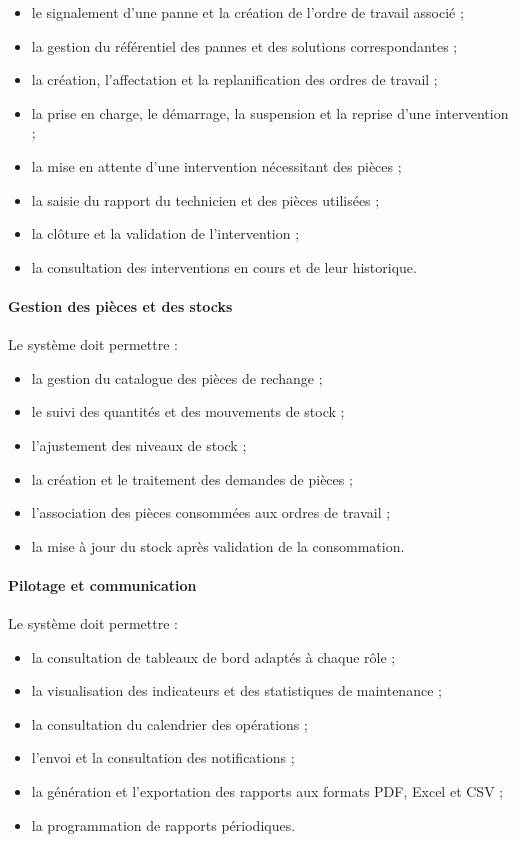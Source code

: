 \begin{itemize}
    \item le signalement d’une panne et la création de l’ordre de travail associé ;
    \item la gestion du référentiel des pannes et des solutions correspondantes ;
    \item la création, l’affectation et la replanification des ordres de travail ;
    \item la prise en charge, le démarrage, la suspension et la reprise d’une intervention ;
    \item la mise en attente d’une intervention nécessitant des pièces ;
    \item la saisie du rapport du technicien et des pièces utilisées ;
    \item la clôture et la validation de l’intervention ;
    \item la consultation des interventions en cours et de leur historique.
\end{itemize}

\paragraph{Gestion des pièces et des stocks}

Le système doit permettre :

\begin{itemize}
    \item la gestion du catalogue des pièces de rechange ;
    \item le suivi des quantités et des mouvements de stock ;
    \item l’ajustement des niveaux de stock ;
    \item la création et le traitement des demandes de pièces ;
    \item l’association des pièces consommées aux ordres de travail ;
    \item la mise à jour du stock après validation de la consommation.
\end{itemize}

\paragraph{Pilotage et communication}

Le système doit permettre :

\begin{itemize}
    \item la consultation de tableaux de bord adaptés à chaque rôle ;
    \item la visualisation des indicateurs et des statistiques de maintenance ;
    \item la consultation du calendrier des opérations ;
    \item l’envoi et la consultation des notifications ;
    \item la génération et l’exportation des rapports aux formats PDF, Excel et CSV ;
    \item la programmation de rapports périodiques.
\end{itemize}

